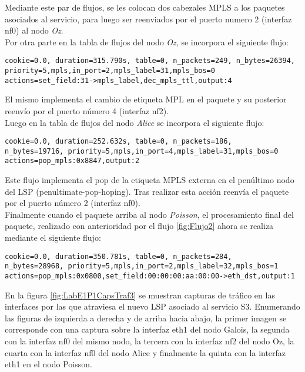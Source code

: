 Mediante este par de flujos, se les colocan dos cabezales MPLS a los paquetes asociados al servicio, para luego ser reenviados por el puerto numero 2 (interfaz nf0) al nodo \textit{Oz}.\\

Por otra parte en la tabla de flujos del nodo \textit{Oz}, se incorpora el siguiente flujo:

\begin{center}
\texttt{cookie=0.0, duration=315.790s, table=0, n\_packets=249, n\_bytes=26394, \\
priority=5,mpls,in\_port=2,mpls\_label=31,mpls\_bos=0 \\
actions=set\_field:31->mpls\_label,dec\_mpls\_ttl,output:4 }
\end{center}

El mismo implementa el cambio de etiqueta MPL en el paquete y su posterior reenvío por el puerto n\'umero 4 (interfaz nf2).\\

Luego en la tabla de flujos del nodo \textit{Alice} se incorpora el siguiente flujo:

\begin{center}
\texttt{cookie=0.0, duration=252.632s, table=0, n\_packets=186, \\
n\_bytes=19716, priority=5,mpls,in\_port=4,mpls\_label=31,mpls\_bos=0 \\
actions=pop\_mpls:0x8847,output:2 }
\end{center}

Este flujo implementa el pop de la etiqueta MPLS externa en el penúltimo nodo del LSP (penultimate-pop-hoping). Tras realizar esta acci\'on reenvía el paquete por el puerto n\'umero 2 (interfaz nf0).\\

Finalmente cuando el paquete arriba al nodo \textit{Poisson}, el procesamiento final del paquete, realizado con anterioridad por el flujo \ref{fig:Flujo2} ahora se realiza mediante el siguiente flujo: 

\begin{center}
\texttt{cookie=0.0, duration=350.781s, table=0, n\_packets=284, \\
n\_bytes=28968, priority=5,mpls,in\_port=2,mpls\_label=32,mpls\_bos=1 \\
actions=pop\_mpls:0x0800,set\_field:00:00:00:aa:00:00->eth\_dst,output:1 }
\end{center}

En la figura \ref{fig:LabE1P1CapsTraf3} se muestran capturas de tr\'afico en las interfaces por las que atraviesa el nuevo LSP asociado al servicio S3. Enumerando las figuras de izquierda a derecha y de arriba hacia abajo, la primer imagen se corresponde con una captura sobre la interfaz eth1 del nodo Galois, la segunda con la interfaz nf0 del mismo nodo, la tercera con la interfaz nf2 del nodo Oz, la cuarta con la interfaz nf0 del nodo Alice y finalmente la quinta con la interfaz eth1 en el nodo Poisson.

